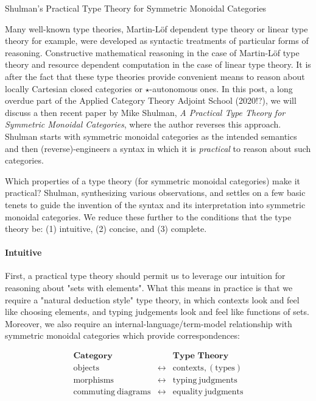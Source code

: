\documentclass[pra,floatfix,
amsmath,superscriptaddress, 12pt]{article}
\author{Nuiok Dicaire and Paul Lessard}
\date{Elsewhen}
\theoremstyle{definition}
\begin{document}
Shulman's Practical Type Theory for Symmetric Monoidal Categories





Many well-known type theories, Martin-L\"{o}f dependent type theory or linear type theory for example, were developed as syntactic treatments of particular forms of reasoning. Constructive mathematical reasoning in the case of Martin-L\"{o}f type theory and resource dependent computation in the case of linear type theory. It is after the fact that these type theories provide convenient means to reason about locally Cartesian closed categories or $\star$-autonomous ones. In this post, a long overdue part of the Applied Category Theory Adjoint School (2020!?), we will discuss a then recent paper by Mike Shulman, 
\textit{A Practical Type Theory for Symmetric Monoidal Categories}, where the author reverses this approach. 
Shulman starts with symmetric monoidal categories as the intended semantics and then (reverse)-engineers a syntax in which it is \emph{practical} to reason about such categories.

\hrulefill

Which properties of a type theory (for symmetric monoidal categories) make it practical? Shulman, synthesizing various observations, and settles on a few basic tenets to guide the invention of the syntax and its interpretation into symmetric monoidal categories. We reduce these further to the conditions that the type theory be: (1) intuitive, (2) concise, and (3) complete.

\paragraph{Intuitive} First, a practical type theory should permit us to leverage our intuition for reasoning about "sets with elements". What this means in practice is that we require a "natural deduction style" type theory, in which contexts look and feel like choosing elements, and typing judgements look and feel like functions of sets. Moreover, we also require an internal-language/term-model relationship with symmetric monoidal categories which provide correspondences:

\begin{eqnarray*}
\textbf{Category}              &  & \textbf{Type Theory}\\
\mathrm{objects}                & \longleftrightarrow & \mathrm{contexts, (types)}\\
\mathrm{morphisms}              & \longleftrightarrow & \mathrm{typing\ judgments}\\
\mathrm{commuting\ diagrams}     & \longleftrightarrow & \mathrm{equality\ judgments}
\end{eqnarray*}
\end{document}
